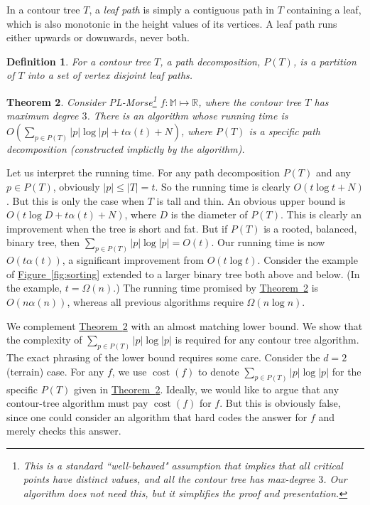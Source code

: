 \documentclass[11pt]{article}
\newtheorem{theorem}{Theorem}
\newtheorem{definition}[theorem]{Definition}
\theoremstyle{definition}
\newcommand{\MM}{\mathbb{M}}
\newcommand{\RR}{\mathbb{R}}
\newcommand{\Fig}[1]{\hyperref[fig:#1]{Figure~\ref*{fig:#1}}} %
\newcommand{\Thm}[1]{\hyperref[thm:#1]{Theorem~\ref*{thm:#1}}} %
\newcommand{\Lem}[1]{\hyperref[lem:#1]{Lemma~\ref*{lem:#1}}} %
\newcommand{\cost}{\mathop{cost}}
\begin{document}
In a contour tree $T$, a \emph{leaf path} is simply a contiguous path in $T$
containing a leaf, which is also monotonic in the height values of its vertices. A leaf path runs either upwards
or downwards, never both.

\begin{definition}
\label{def:path} For a contour tree $T$, a \emph{path decomposition}, $P(T)$, is a partition of $T$ into a set of vertex disjoint leaf paths.  
\end{definition}

\begin{theorem} \label{thm:main-alg} Consider PL-Morse\footnote{This is a standard ``well-behaved" assumption that implies
that all critical points have distinct values, and all the contour tree has max-degree $3$. Our algorithm
does not need this, but it simplifies the proof and presentation.} $f:\MM \mapsto \RR$, where the contour tree $T$
has maximum degree $3$. There is an algorithm whose running time is $O(\sum_{p \in P(T)} |p|\log |p| + t\alpha(t) + N)$,
where $P(T)$ is a specific path decomposition (constructed implictly by the algorithm).
\end{theorem}

Let us interpret the running time. 
For any path decomposition $P(T)$ and any $p \in P(T)$, obviously $|p| \leq |T| = t$.
So the running time is clearly $O(t\log t + N)$. But this is only the case when $T$ is tall and thin.  
An obvious upper bound is $O(t\log D + t\alpha(t) + N)$, where $D$ is the diameter of $P(T)$. 
This is clearly an improvement when the tree is short and fat.
But if $P(T)$ is a rooted, balanced, binary tree, then $\sum_{p \in P(T)} |p|\log |p| = O(t)$.
Our running time is now $O(t\alpha(t))$, a significant improvement from $O(t\log t)$.
Consider the example of \Fig{sorting} extended to a larger binary tree both above and below.
(In the example, $t = \Omega(n)$.) The running time promised by \Thm{main-alg}
is $O(n\alpha(n))$, whereas all previous algorithms require $\Omega(n\log n)$.

We complement \Thm{main-alg} with an almost matching lower bound. We show that the complexity
of $\sum_{p \in P(T)} |p|\log |p|$ is required for any contour tree algorithm. The exact phrasing
of the lower bound requires some care. Consider the $d=2$ (terrain) case. For any $f$,
we use $\cost(f)$ to denote $\sum_{p \in P(T)} |p|\log |p|$ for the specific $P(T)$
given in \Thm{main-alg}. Ideally, we would like to argue that any contour-tree algorithm
must pay $\cost(f)$ for $f$. But this is obviously false, since one could consider an algorithm
that hard codes the answer for $f$ and merely checks this answer.
\end{document}
